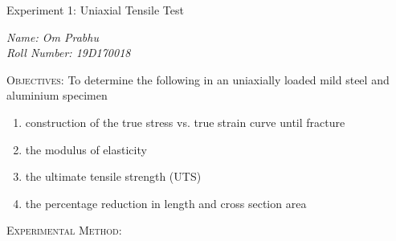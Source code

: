 \documentclass[a4paper, 11pt]{article}
\begin{document}
\begin{center}
	{\Large \sc Experiment 1: Uniaxial Tensile Test}
\end{center}
\textit{Name: Om Prabhu\\
Roll Number: 19D170018}
\vspace{-1.5mm}

\hrulefill
\vspace{2mm}

\textsc{Objectives:} To determine the following in an uniaxially loaded mild steel and aluminium specimen
\vspace{-2mm}

\begin{enumerate}[label=(\alph*)]
	\itemsep-0.2em
	\item construction of the true stress vs. true strain curve until fracture
	\item the modulus of elasticity
	\item the ultimate tensile strength (UTS)
	\item the percentage reduction in length and cross section area
\end{enumerate}
\textsc{Experimental Method:}
\vspace{-2mm}
\end{document}
